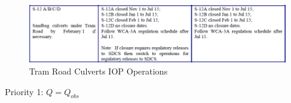 \begin{figure}[!h]
  \begin{center}
  \includegraphics[width=6.5in]{../figs/S12s_IOPops.png}
  \caption{Tram Road Culverts IOP Operations}
  \label{fig:S12siop}
  \end{center}
\end{figure}

\begin{packed_items}
\item Priority 1: $Q = Q_{obs}$
\end{packed_items}


%
%



